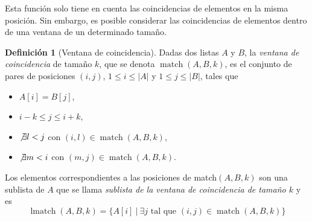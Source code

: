 \documentclass[a4paper,10pt,twoside]{article}
\theoremstyle{definition}
\newtheorem{definition}{Definición}
\begin{document}
Esta función solo tiene en cuenta las coincidencias de elementos en la misma posición. 
Sin embargo, es posible considerar las coincidencias de elementos dentro de una ventana de un determinado tamaño.

\begin{definition}[Ventana de coincidencia]
Dadas dos listas $A$ y $B$, la \emph{ventana de coincidencia} de tamaño $k$, que se denota $\operatorname{match}(A,B,k)$, es el conjunto de pares de posiciones $(i,j)$, $1\leq i\leq |A|$ y $1\leq j\leq |B|$, tales
que
\begin{itemize}[noitemsep,label=--]
\item $A[i]=B[j]$,
\item $i-k\leq j\leq i+k$,
\item $\not \exists l<j$ con $(i,l)\in \operatorname{match}(A,B,k)$,
\item $\not \exists m<i$ con $(m,j)\in \operatorname{match}(A,B,k)$.
\end{itemize}

Los elementos correspondientes a las posiciones de match$(A,B,k)$ son una sublista de $A$ que se llama \emph{sublista de la ventana de coincidencia de tamaño $k$} y es
\[
\operatorname{lmatch}(A,B,k)= \{A[i]\ |\ \exists j \text{ tal que  } (i,j)\in \operatorname{match}(A,B,k)\}
\]
\end{definition}
\end{document}
